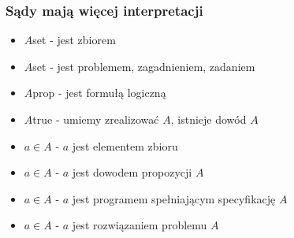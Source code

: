 \documentclass{beamer}
\begin{document}
\begin{frame}
\frametitle{Sądy mają więcej interpretacji}

\begin{itemize}
 \item $A$\;set -  jest zbiorem
 \item $A$\;set -  jest problemem, zagadnieniem, zadaniem
 \item $A$\;prop - jest formułą logiczną
 \item $A$\;true - umiemy zrealizować $A$, istnieje dowód $A$
 \item $a \in A$ - $a$ jest elementem zbioru
 \item $a \in A$ - $a$ jest dowodem propozycji $A$
 \item $a \in A$ - $a$ jest programem spełniającym specyfikację $A$
 \item $a \in A$ - $a$ jest rozwiązaniem problemu $A$
\end{itemize}
\end{frame}

\end{document}
